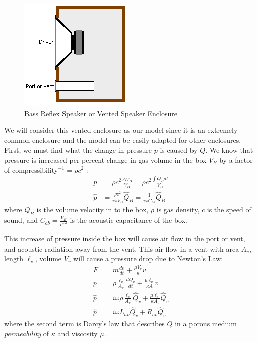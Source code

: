 \documentclass[10pt]{book}
\begin{document}
\begin{figure}
\centering
\includegraphics[height=0.25\textheight]{Bass_reflex_spk.png}
\caption{Bass Reflex Speaker or Vented Speaker Enclosure}\label{bass_reflex}
\end{figure}

We will consider this vented enclosure as our model since it is an extremely common enclosure  and the model can be easily adapted for other enclosures. First, we must find what the change in pressure $p$ is caused by $Q$. We know that pressure is increased per percent change in gas volume in the box $V_B$ by a factor of compressibility$^{-1}=\rho c^2$ :
\begin{align}
p&=\rho c^2 \frac{\Delta V_B}{V_B}=\rho c^2 \frac{\int Q_B dt}{V_B}\\
\hat{p}&=\frac{\rho c^2}{i\omega V_B}\hat{Q}_B=\frac{1}{i\omega C_{ab}}\hat{Q}_B\label{acoustic_compression}
\end{align}
where $Q_B$ is the volume velocity in to the box, $\rho$ is gas density, $c$ is the speed of sound, and $C_{ab}=\frac{V_B}{\rho c^2}$ is the acoustic capacitance of the box.

This increase of pressure inside the box will cause air flow in 
the port or vent, and acoustic radiation away from the vent. This air flow in a vent with area $A_v$, length $\ell_v$, volume $V_v$ will cause a pressure drop due to Newton's Law:
\begin{align}
F&=m\frac{dv}{dt}+\frac{\mu V_v}{\kappa} v\\
p&=\rho \frac{\ell_v}{A_v}\frac{dQ_v}{dt}+\frac{\mu \ell_v}{\kappa A} v\\
\hat{p}&=i\omega\rho \frac{\ell_v}{A_v}\hat{Q}_v+\frac{\mu \ell_v}{\kappa A_v} \hat{Q}_v\\
\hat{p}&=i\omega L_{av} \hat{Q}_v+R_{av} \hat{Q}_v \label{acoustic_flow}
\end{align}
where the second term is Darcy's law that describes $Q$ in a porous medium \textit{permeability} of $\kappa$ and viscosity $\mu$.
\end{document}
